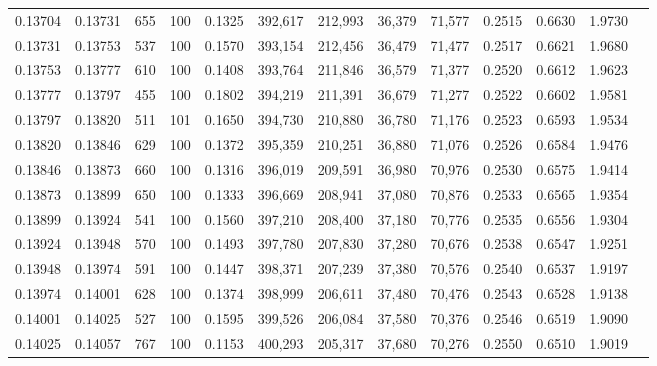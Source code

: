 \begin{tabular}{rrrrrrrrrrrrr}
0.13704 & 0.13731 &   655 & 100 &                                     0.1325 & 392,617 & 212,993 &  36,379 &  71,577 & 0.2515 & 0.6630 & 1.9730 \\
0.13731 & 0.13753 &   537 & 100 &                                     0.1570 & 393,154 & 212,456 &  36,479 &  71,477 & 0.2517 & 0.6621 & 1.9680 \\
0.13753 & 0.13777 &   610 & 100 &                                     0.1408 & 393,764 & 211,846 &  36,579 &  71,377 & 0.2520 & 0.6612 & 1.9623 \\
0.13777 & 0.13797 &   455 & 100 &                                     0.1802 & 394,219 & 211,391 &  36,679 &  71,277 & 0.2522 & 0.6602 & 1.9581 \\
0.13797 & 0.13820 &   511 & 101 &                                     0.1650 & 394,730 & 210,880 &  36,780 &  71,176 & 0.2523 & 0.6593 & 1.9534 \\
0.13820 & 0.13846 &   629 & 100 &                                     0.1372 & 395,359 & 210,251 &  36,880 &  71,076 & 0.2526 & 0.6584 & 1.9476 \\
0.13846 & 0.13873 &   660 & 100 &                                     0.1316 & 396,019 & 209,591 &  36,980 &  70,976 & 0.2530 & 0.6575 & 1.9414 \\
0.13873 & 0.13899 &   650 & 100 &                                     0.1333 & 396,669 & 208,941 &  37,080 &  70,876 & 0.2533 & 0.6565 & 1.9354 \\
0.13899 & 0.13924 &   541 & 100 &                                     0.1560 & 397,210 & 208,400 &  37,180 &  70,776 & 0.2535 & 0.6556 & 1.9304 \\
0.13924 & 0.13948 &   570 & 100 &                                     0.1493 & 397,780 & 207,830 &  37,280 &  70,676 & 0.2538 & 0.6547 & 1.9251 \\
0.13948 & 0.13974 &   591 & 100 &                                     0.1447 & 398,371 & 207,239 &  37,380 &  70,576 & 0.2540 & 0.6537 & 1.9197 \\
0.13974 & 0.14001 &   628 & 100 &                                     0.1374 & 398,999 & 206,611 &  37,480 &  70,476 & 0.2543 & 0.6528 & 1.9138 \\
0.14001 & 0.14025 &   527 & 100 &                                     0.1595 & 399,526 & 206,084 &  37,580 &  70,376 & 0.2546 & 0.6519 & 1.9090 \\
0.14025 & 0.14057 &   767 & 100 &                                     0.1153 & 400,293 & 205,317 &  37,680 &  70,276 & 0.2550 & 0.6510 & 1.9019 \\

\end{tabular}
